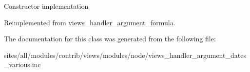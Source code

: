Constructor implementation 

Reimplemented from \hyperlink{classviews__handler__argument__formula_01284402427de2bcfa1b1da5792a2332}{views\_\-handler\_\-argument\_\-formula}.

The documentation for this class was generated from the following file:\begin{CompactItemize}
\item 
sites/all/modules/contrib/views/modules/node/views\_\-handler\_\-argument\_\-dates\_\-various.inc\end{CompactItemize}
